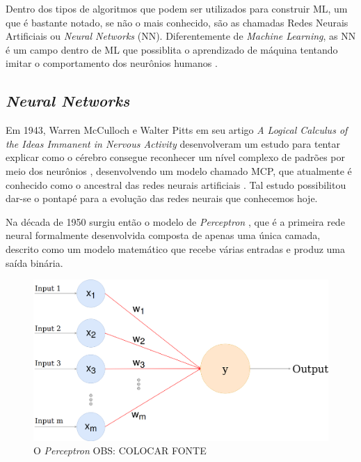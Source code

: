 Dentro dos tipos de algoritmos que podem ser utilizados para construir ML, um que é bastante notado, se não o mais conhecido, são as chamadas Redes Neurais Artificiais ou \textit{Neural Networks} (NN). Diferentemente de \textit{Machine Learning}, as NN é um campo dentro de ML que possiblita o aprendizado de máquina tentando imitar o comportamento dos neurônios humanos \cite{neural-net-history}.

\subsection{\textit{Neural Networks}}

Em 1943, Warren McCulloch e Walter Pitts em seu artigo \textit{A Logical Calculus of the Ideas Immanent in Nervous Activity} desenvolveram um estudo para tentar explicar como o cérebro consegue reconhecer um nível complexo de padrões por meio dos neurônios \cite{first-neuron-study}, desenvolvendo um modelo chamado MCP, que atualmente é conhecido como o ancestral das redes neurais artificiais \cite{dl-brief-review}. Tal estudo possibilitou dar-se o pontapé para a evolução das redes neurais que conhecemos hoje.

Na década de 1950 surgiu então o modelo de \textit{Perceptron} \cite{perceptron}, que é a primeira rede neural formalmente desenvolvida composta de apenas uma única camada, descrito como um modelo matemático que recebe várias entradas e produz uma saída binária.


\begin{figure}[h]
  \includegraphics[width=13cm, center]{figuras/perceptron}
  \caption{O \textit{Perceptron} \color{red} OBS: COLOCAR FONTE}
  \label{fig:perceptron}
\end{figure}

